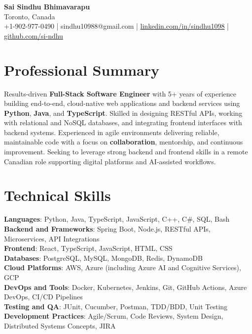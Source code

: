 \documentclass[letterpaper,11pt]{article}
\begin{document}
\begin{center}
  {\Large \textbf{Sai Sindhu Bhimavarapu}} \\
  Toronto, Canada \\
  +1-902-977-0490 \enspace | \enspace sindhu10988@gmail.com \enspace | \enspace \href{https://www.linkedin.com/in/sindhu1098/}{linkedin.com/in/sindhu1098} \enspace | \enspace \href{https://github.com/si-ndhu}{github.com/si-ndhu}
\end{center}

\section{Professional Summary}
  \begin{itemize}[leftmargin=0.15in, label={}]
    \small{\item{
     Results-driven \textbf{Full-Stack Software Engineer} with 5+ years of experience building end-to-end, cloud-native web applications and backend services using \textbf{Python}, \textbf{Java}, and \textbf{TypeScript}. Skilled in designing RESTful APIs, working with relational and NoSQL databases, and integrating frontend interfaces with backend systems. Experienced in agile environments delivering reliable, maintainable code with a focus on \textbf{collaboration}, mentorship, and continuous improvement. Seeking to leverage strong backend and frontend skills in a remote Canadian role supporting digital platforms and AI-assisted workflows.
    }}
  \end{itemize}
\vspace{-16pt}

\section{Technical Skills}
 \begin{itemize}[leftmargin=0.15in, label={}]
    \small{\item{
     \textbf{Languages}: Python, Java, TypeScript, JavaScript, C++, C\#, SQL, Bash \\
     \textbf{Backend and Frameworks}: Spring Boot, Node.js, RESTful APIs, Microservices, API Integrations \\
     \textbf{Frontend}: React, TypeScript, JavaScript, HTML, CSS \\
     \textbf{Databases}: PostgreSQL, MySQL, MongoDB, Redis, DynamoDB \\
     \textbf{Cloud Platforms}: AWS, Azure (including Azure AI and Cognitive Services), GCP \\
     \textbf{DevOps and Tools}: Docker, Kubernetes, Jenkins, Git, GitHub Actions, Azure DevOps, CI/CD Pipelines \\
     \textbf{Testing and QA}: JUnit, Cucumber, Postman, TDD/BDD, Unit Testing \\
     \textbf{Development Practices}: Agile/Scrum, Code Reviews, System Design, Distributed Systems Concepts, JIRA
    }}
 \end{itemize}
\vspace{-16pt}
\end{document}
